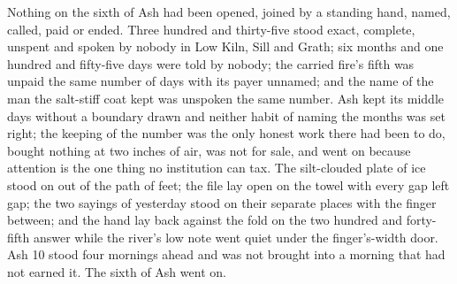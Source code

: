 Nothing on the sixth of Ash had been opened, joined by a standing hand, named, called, paid or ended. Three hundred and thirty-five stood exact, complete, unspent and spoken by nobody in Low Kiln, Sill and Grath; six months and one hundred and fifty-five days were told by nobody; the carried fire's fifth was unpaid the same number of days with its payer unnamed; and the name of the man the salt-stiff coat kept was unspoken the same number. Ash kept its middle days without a boundary drawn and neither habit of naming the months was set right; the keeping of the number was the only honest work there had been to do, bought nothing at two inches of air, was not for sale, and went on because attention is the one thing no institution can tax. The silt-clouded plate of ice stood on  out of the path of feet; the file lay open on the towel with every gap left gap; the two sayings of yesterday stood on their separate places with the finger between; and the hand lay back against the fold on the two hundred and forty-fifth answer while the river's low note went quiet under the finger's-width door. Ash 10 stood four mornings ahead and was not brought into a morning that had not earned it. The sixth of Ash went on.
